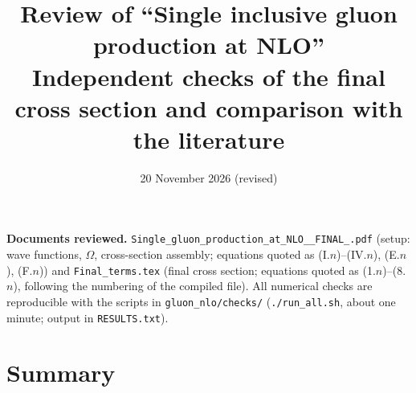 \documentclass[10pt]{article}
\title{\textbf{Review of ``Single inclusive gluon production at NLO''}\\[3pt]
\large Independent checks of the final cross section and comparison with the literature}
\author{}
\date{20 November 2026 (revised)}
\begin{document}
\maketitle

\noindent\textbf{Documents reviewed.} \texttt{Single\_gluon\_production\_at\_NLO\_\_FINAL\_.pdf} (setup: wave functions, $\Omega$, cross-section
assembly; equations quoted as (I.$n$)--(IV.$n$), (E.$n$), (F.$n$)) and \texttt{Final\_terms.tex} (final cross section; equations quoted as
(1.$n$)--(8.$n$), following the numbering of the compiled file). All numerical checks are reproducible with the scripts in
\texttt{gluon\_nlo/checks/} (\texttt{./run\_all.sh}, about one minute; output in \texttt{RESULTS.txt}).

\tableofcontents

\section{Summary}
\end{document}

